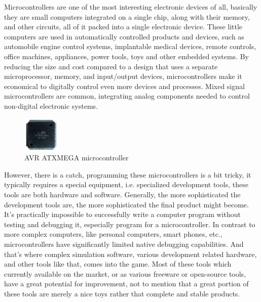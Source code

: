 \documentclass[a4paper,twoside,15pt]{book}
\begin{document}
		Microcontrollers are one of the most interesting electronic devices of all, basically they are small computers integrated on a single chip, along with their memory, and other circuits, all of it packed into a single electronic device. These little computers are used in automatically controlled products and devices, such as automobile engine control systems, implantable medical devices, remote controls, office machines, appliances, power tools, toys and other embedded systems. By reducing the size and cost compared to a design that uses a separate microprocessor, memory, and input/output devices, microcontrollers make it economical to digitally control even more devices and processes. Mixed signal microcontrollers are common, integrating analog components needed to control non-digital electronic systems.

		\begin{figure}
			\centering{}
			\includegraphics[width=50pt]{images/AVR_ATXMEGA_128A1.jpeg}
			\caption{AVR ATXMEGA microcontroller}
		\end{figure}
		However, there is a catch, programming these microcontrollers is a bit tricky, it typically requires a special equipment, i.e. specialized development tools, these tools are both hardware and software. Generally, the more sophisticated the development tools are, the more sophisticated the final product might become. It's practically impossible to successfully write a computer program without testing and debugging it, especially program for a microcontroller. In contrast to more complex computers, like personal computers, smart phones, etc., microcontrollers have significantly limited native debugging capabilities. And that's where complex simulation software, various development related hardware, and other tools like that, comes into the game. Most of these tools which currently available on the market, or as various freeware or open-source tools, have a great potential for improvement, not to mention that a great portion of these tools are merely a nice toys rather that complete and stable products.
\end{document}
